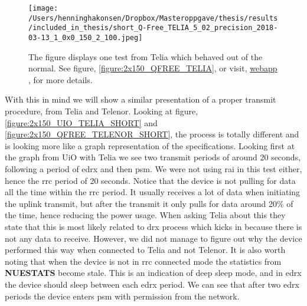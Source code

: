 \documentclass[USenglish]{ifimaster}  %
\begin{document}
\begin{figure}[H]
  \centering
  \texttt{[image: /Users/henninghakonsen/Dropbox/Masteroppgave/thesis/results/included\_in\_thesis/short\_Q-Free\_TELIA\_5\_02\_precision\_2018-03-13\_1\_0x0\_150\_2\_100.jpeg]}
  \caption[Short-term test - unusual behavior, Telia]{The figure displays one test from Telia which behaved out of the normal. See figure, \vref{figure:2x150_QFREE_TELIA}, or visit, \href{http://158.39.77.97:9000/\#/results/Q-Free\_TELIA\_5.02\_precision\_2018-03-13\_1\_0x0\_150\_2\_100}{webapp} \cite{online:result0}, for more details.}
  \label{figure:2x150_QFREE_TELIA_SHORT}
\end{figure}

With this in mind we will show a similar presentation of a proper transmit procedure, from Telia and Telenor. Looking at figure, \vref{figure:2x150_UIO_TELIA_SHORT} and \vref{figure:2x150_QFREE_TELENOR_SHORT}, the process is totally different and is looking more like a graph representation of the specifications. Looking first at the graph from UiO with Telia we see two transmit periods of around 20 seconds, following a period of \acrshort{edrx} and then \acrshort{psm}. We were not using \acrshort{rai} in this test either, hence the \acrshort{rrc} period of 20 seconds. Notice that the device is not pulling for data all the time within the \acrshort{rrc} period. It usually receives a lot of data when initiating the uplink transmit, but after the transmit it only pulls for data around 20\% of the time, hence reducing the power usage. When asking Telia about this they state that this is most likely related to \acrshort{drx} process which kicks in because there is not any data to receive\cite{email:telia}. However, we did not manage to figure out why the device performed this way when connected to Telia and not Telenor.
It is also worth noting that when the device is not in \acrshort{rrc} connected mode the statistics from \textbf{NUESTATS} become stale. This is an indication of deep sleep mode, and in \acrshort{edrx} the device should sleep between each \acrshort{edrx} period. We can see that after two \acrshort{edrx} periods the device enters \acrshort{psm} with permission from the network.
\end{document}
